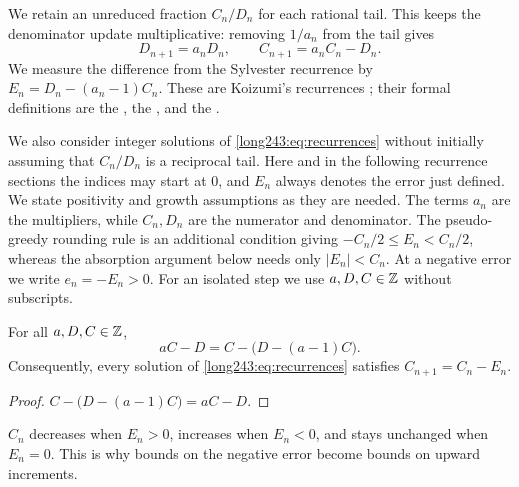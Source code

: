 \documentclass[11pt]{article}
\begin{document}
We retain an unreduced fraction $C_n/D_n$ for each rational tail.
This keeps the denominator update multiplicative: removing $1/a_n$
from the tail gives
\begin{equation}\label{long243:eq:recurrences}
 D_{n+1}=a_nD_n,\qquad C_{n+1}=a_nC_n-D_n.
\end{equation}
We measure the difference from the Sylvester recurrence by
$E_n=D_n-(a_n-1)C_n$. These are Koizumi's recurrences
\cite[Lemma~4, pp.~11--12]{koizumi2025}; their formal definitions are the
, the
,
and the
.

We also consider integer solutions of \eqref{long243:eq:recurrences}
without initially assuming that $C_n/D_n$ is a reciprocal tail.
Here and in the following recurrence sections the indices may start
at $0$, and $E_n$ always denotes the error just defined. We state
positivity and growth assumptions as they are needed. The terms $a_n$
are the multipliers, while $C_n,D_n$ are the numerator and denominator.
The pseudo-greedy rounding rule is an additional condition giving $-C_n/2\le E_n<C_n/2$, whereas the
absorption argument below needs only $|E_n|<C_n$. At a negative error we
write $e_n=-E_n>0$. For an isolated step we use $a,D,C\in\mathbb{Z}$ without
subscripts.

\begin{proposition}\label{long243:res:update}
For all $a,D,C\in\mathbb{Z}$,
\[
 aC-D=C-\bigl(D-(a-1)C\bigr).
\]
Consequently, every solution of \eqref{long243:eq:recurrences} satisfies $C_{n+1}=C_n-E_n$.
\end{proposition}

\begin{proof}
$C-\bigl(D-(a-1)C\bigr)=aC-D$.
\end{proof}

$C_n$ decreases when $E_n>0$, increases when $E_n<0$, and
stays unchanged when $E_n=0$. This is why bounds on the negative error
become bounds on upward increments.
\end{document}
